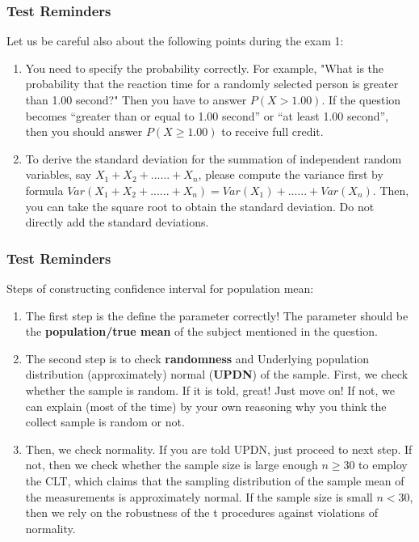 \documentclass{beamer}
\begin{document}
 



\begin{frame}
\frametitle{Test Reminders}

Let us be careful also about the following points during the exam 1:

\begin{enumerate}
\item You need to specify the
probability correctly. For example, "What is the probability that the reaction time for a randomly selected person is greater than 1.00 second?" Then you have to answer $P(X > 1.00)$. If the question becomes “greater than or equal to 1.00 second”
or “at least 1.00 second”, then you should answer $P(X \ge 1.00)$ to receive full credit.
\item To derive the standard deviation for the summation of independent random variables, say $X_1+X_2+......+X_n$,
please compute the variance first by formula $Var(X_1 + X_2 + ...... + X_n) = Var(X_1) + ...... + Var(X_n)$.
Then, you can take the square root to obtain the standard deviation. Do not directly add the standard
deviations.

\end{enumerate}
\end{frame}

\begin{frame}
\frametitle{Test Reminders}

Steps of constructing confidence interval for population mean:

\begin{enumerate}
\item The first step is the define the parameter correctly! The parameter should be the \textbf{population/true mean} of the subject mentioned in the question. 

\item The second step is to check \textbf{randomness} and Underlying population distribution (approximately) normal (\textbf{UPDN}) of the sample. First, we check whether the sample is random. If it is told, great! Just move on! If not, we can explain (most of the time) by your own reasoning why you think the collect sample is random or not.

\item Then, we check normality. If you are told UPDN, just proceed to next step. If not, then we check whether the sample size is large enough $n\ge 30$ to employ the CLT, which claims that the sampling distribution of the sample mean of the measurements is approximately normal. If the sample size is small $n<30$, then we rely on the robustness of the t procedures against violations of normality.

\end{enumerate}
\end{frame}
\end{document}
